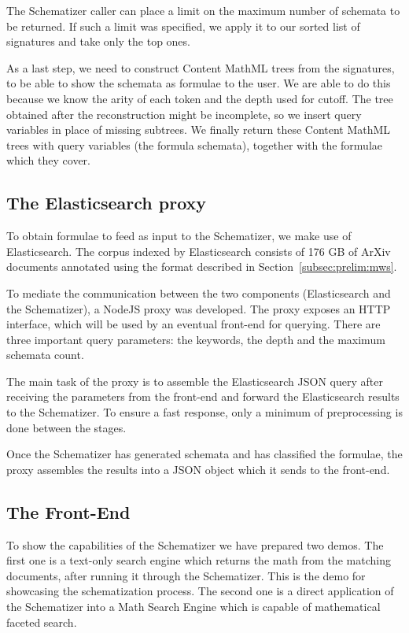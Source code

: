\documentclass[a4paper,oneside]{article}
\def\cmml{\textsf{Content MathML}\xspace}
\def\arxiv{\textsf{ArXiv}\xspace}
\begin{document}
The Schematizer caller can place a limit on the maximum number of schemata to be
returned. If such a limit was specified, we apply it to our sorted list of
signatures and take only the top ones.

As a last step, we need to construct \cmml trees from the signatures,
to be able to show the schemata as formulae to the user. We are able to do
this because we know the arity of each token and the depth used for cutoff.
The tree obtained after the reconstruction might be incomplete, so we insert
query variables in place of missing subtrees.
We finally return these \cmml trees with query variables (the formula
schemata), together with the formulae which they cover.

\subsection{The Elasticsearch proxy}\label{subsec:esproxy}
To obtain formulae to feed as input to the Schematizer, we make use of
Elasticsearch. The corpus indexed by Elasticsearch consists of 176 GB of \arxiv
documents annotated using the format described in
Section~\ref{subsec:prelim:mws}.

To mediate the communication between the two components (Elasticsearch and the
Schematizer), a NodeJS proxy was developed. The proxy exposes an HTTP
interface, which will be used by an eventual front-end for querying.
There are three important query parameters: the keywords, the depth and the
maximum schemata count.

The main task of the proxy is to assemble the Elasticsearch JSON query after
receiving the parameters from the front-end and forward the Elasticsearch
results to the Schematizer. To ensure a fast response, only a minimum of
preprocessing is done between the stages.

Once the Schematizer has generated schemata and has classified the formulae,
the proxy assembles the results into a JSON object which it sends to the
front-end.

\subsection{The Front-End}\label{subsec:frontend_schema}
To show the capabilities of the Schematizer we have prepared two demos.
The first one is a text-only search engine which returns the math from the
matching documents, after running it through the Schematizer. This is the demo
for showcasing the schematization process. The second one is a direct
application of the Schematizer into a Math Search Engine which is capable of
mathematical faceted search.
\end{document}
